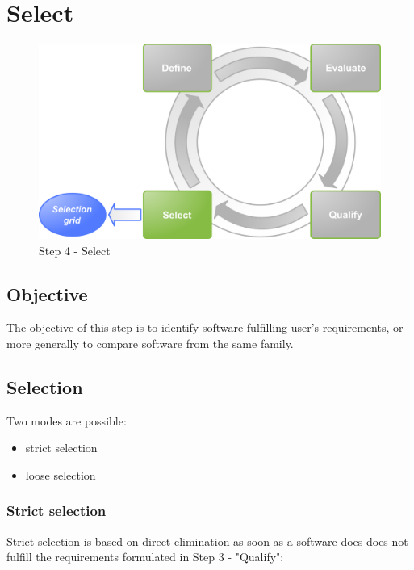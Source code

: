 %
\section{Select}
\begin{figure}[h]
\includegraphics[width=13cm]{images/selectionner}
\caption{Step 4 - Select}
\end{figure}

\subsection{Objective}
The objective of this step is to identify software fulfilling user's requirements, 
or more generally to compare software from the same family.

\subsection{Selection}
Two modes are possible:
\begin{itemize}
\item strict selection
\item loose selection
\end{itemize}


\subsubsection{Strict selection}
Strict selection is based on direct elimination as soon as a software
does does not fulfill the requirements formulated in Step 3 - "Qualify":

